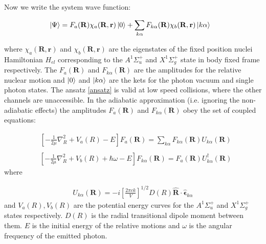 Now we write the system wave function:

\begin{equation}\label{ansatz}
\begin{split}
& \Ket{\Psi} = F_a(\mathbf{R})\chi_a(\mathbf{R},\mathbf{r})\Ket{0} + \sum_{k\alpha}{F_{k\alpha}(\mathbf{R})\chi_b(\mathbf{R},\mathbf{r})\Ket{k\alpha}}
\end{split}
\end{equation}

where $ \chi_a(\mathbf{R},\mathbf{r}) $ and $ \chi_b(\mathbf{R},\mathbf{r}) $ are the eigenstates of the fixed position nuclei Hamiltonian $ H_{el} $ corresponding to the $ A^{1}\Sigma^{+}_u $  and $ X^{1}\Sigma^{+}_g $ state in body fixed frame respectively. The $ F_a(\mathbf{R}) $ and $ F_{k\alpha}(\mathbf{R}) $ are the amplitudes for the relative nuclear motion and $ \Ket{0} $ and $ \Ket{k\alpha} $ are the kets for the photon vacuum and single photon states. The ansatz \eqref{ansatz} is valid at low speed collisions, where the other channels are unaccessible. In the adiabatic approximation (i.e. ignoring the non-adiabatic effects) the amplitudes $ F_a(\mathbf{R}) $ and $ F_{k\alpha}(\mathbf{R}) $ obey the set of coupled equations:

\begin{equation}\label{Fk}
\begin{split}
& \left[-\frac{1}{2\mu}\nabla^2_{R} + V_a(R) - E\right]F_a(\mathbf{R}) = \sum_{k\alpha}{F_{k\alpha}(\mathbf{R})U_{k\alpha}(\mathbf{R}) } \\[.8em]
\end{split}
\end{equation}
\begin{equation}\label{Fka}
\begin{split}
& \left[-\frac{1}{2\mu}\nabla^2_{R} + V_b(R) + \hbar\omega - E\right]F_{k\alpha}(\mathbf{R}) = F_a(\mathbf{R})U^{\dagger}_{k\alpha}(\mathbf{R}) 
\end{split}
\end{equation}
where

\begin{equation}
\begin{split}
U_{k\alpha}(\mathbf{R}) = -i\left[\frac{2\pi c k}{V}\right]^{1/2}D(R)\hat{\mathbf{R}}\cdot\hat{\mathbf{\epsilon}}_{k\alpha}
\end{split}
\end{equation}
and $ V_a(R), V_b(R) $ are the potential energy curves for the $ A^{1}\Sigma^{+}_u $ and $ X^{1}\Sigma^{+}_g $ states respectively.   $ D(R) $ is the radial transitional dipole moment between them. $ E $ is the initial energy of the relative motions and $ \omega $ is the angular frequency of the emitted photon. 

